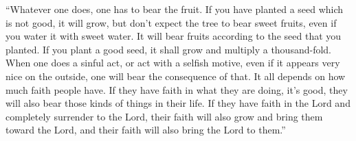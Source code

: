 \enquote{Whatever one does, one has to bear the fruit. If you have planted a seed which is not good, it will grow, but don’t expect the tree to bear sweet fruits, even if you water it with sweet water. It will bear fruits according to the seed that you planted. If you plant a good seed, it shall grow and multiply a thousand-fold. When one does a sinful act, or act with a selfish motive, even if it appears very nice on the outside, one will bear the consequence of that. It all depends on how much faith people have. If they have faith in what they are doing, it’s good, they will also bear those kinds of things in their life. If they have faith in the Lord and completely surrender to the Lord, their faith will also grow and bring them toward the Lord, and their faith will also bring the Lord to them.}

